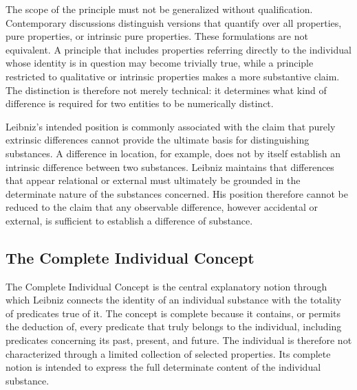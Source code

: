 \label{para:VS.B01.P01.C08.S07.SS04.P004}

The scope of the principle must not be generalized
without qualification. Contemporary discussions
distinguish versions that quantify over all
properties, pure properties, or intrinsic pure
properties. These formulations are not equivalent.
A principle that includes properties referring
directly to the individual whose identity is in
question may become trivially true, while a
principle restricted to qualitative or intrinsic
properties makes a more substantive claim.
The distinction is therefore not merely technical:
it determines what kind of difference is required
for two entities to be numerically distinct.
\cite{RodriguezPereyraIdentitySEP2025}

\label{para:VS.B01.P01.C08.S07.SS04.P005}

Leibniz's intended position is commonly associated
with the claim that purely extrinsic differences
cannot provide the ultimate basis for distinguishing
substances. A difference in location, for example,
does not by itself establish an intrinsic difference
between two substances. Leibniz maintains that
differences that appear relational or external
must ultimately be grounded in the determinate
nature of the substances concerned. His position
therefore cannot be reduced to the claim that
any observable difference, however accidental
or external, is sufficient to establish a
difference of substance. \cite[II.xxvii]{LeibnizNewEssays}
\cite{LookLeibnizSEP2020}



\subsection{The Complete Individual Concept}
\label{subsec:ch08-leibniz-complete-concept}

\label{para:VS.B01.P01.C08.S07.SS05.P001}

The Complete Individual Concept is the central
explanatory notion through which Leibniz connects
the identity of an individual substance with
the totality of predicates true of it. The concept
is complete because it contains, or permits the
deduction of, every predicate that truly belongs
to the individual, including predicates concerning
its past, present, and future. The individual
is therefore not characterized through a
limited collection of selected properties.
Its complete notion is intended to express
the full determinate content of the individual
substance. \cite[§8]{LeibnizDiscourse}


